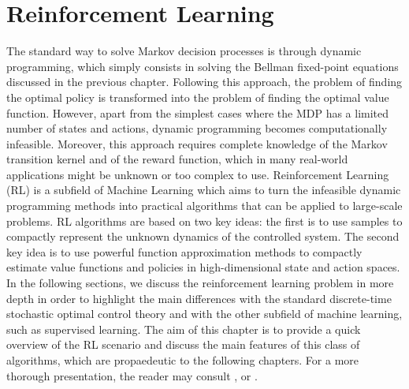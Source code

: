 \chapter{Reinforcement Learning}

The standard way to solve Markov decision processes is through dynamic programming, which simply consists in solving the Bellman fixed-point equations discussed in the previous chapter. Following this approach, the problem of finding the optimal policy is transformed into the problem of finding the optimal value function. However, apart from the simplest cases where the MDP has a limited number of states and actions, dynamic programming becomes computationally infeasible. Moreover, this approach requires complete knowledge of the Markov transition kernel and of the reward function, which in many real-world applications might be unknown or too complex to use. Reinforcement Learning (RL) is a subfield of Machine Learning which aims to turn the infeasible dynamic programming methods into practical algorithms that can be applied to large-scale problems. RL algorithms are based on two key ideas: the first is to use samples to compactly represent the unknown dynamics of the controlled system. The second key idea is to use powerful function approximation methods to compactly estimate value functions and policies in high-dimensional state and action spaces. In the following sections, we discuss the reinforcement learning problem in more depth in order to highlight the main differences with the standard discrete-time stochastic optimal control theory and with the other subfield of machine learning, such as supervised learning. The aim of this chapter is to provide a quick overview of the RL scenario and discuss the main features of this class of algorithms, which are propaedeutic to the following chapters. For a more thorough presentation, the reader may consult \cite{sutton1998introduction}, \cite{szepesvari2010algorithms} or \cite{wiering2012reinforcement}.

